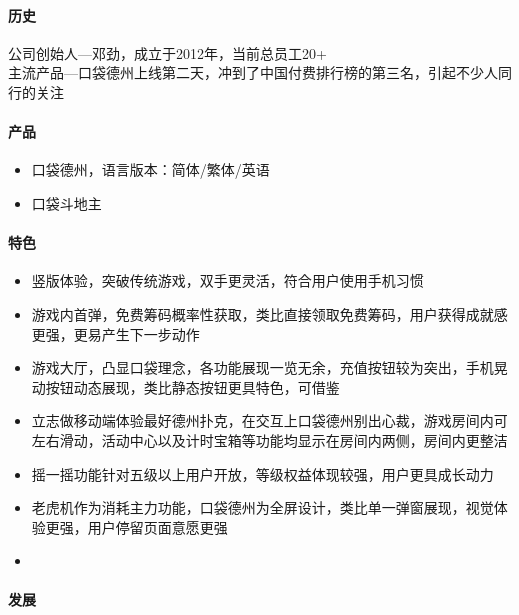 \documentclass[11pt]{article}
\providecommand{\tightlist}{%
      \setlength{\itemsep}{0pt}\setlength{\parskip}{0pt}}
\begin{document}
\hypertarget{ux5386ux53f2}{%
\paragraph{历史}\label{ux5386ux53f2}}

公司创始人---邓劲，成立于2012年，当前总员工20+\\
主流产品---口袋德州上线第二天，冲到了中国付费排行榜的第三名，引起不少人同行的关注

\hypertarget{ux4ea7ux54c1}{%
\paragraph{产品}\label{ux4ea7ux54c1}}

\begin{itemize}
\tightlist
\item
  口袋德州，语言版本：简体/繁体/英语
\item
  口袋斗地主
\end{itemize}

\hypertarget{ux7279ux8272}{%
\paragraph{特色}\label{ux7279ux8272}}

\begin{itemize}
\item
  竖版体验，突破传统游戏，双手更灵活，符合用户使用手机习惯
\item
  游戏内首弹，免费筹码概率性获取，类比直接领取免费筹码，用户获得成就感更强，更易产生下一步动作
\item
  游戏大厅，凸显口袋理念，各功能展现一览无余，充值按钮较为突出，手机晃动按钮动态展现，类比静态按钮更具特色，可借鉴
\item
  立志做移动端体验最好德州扑克，在交互上口袋德州别出心裁，游戏房间内可左右滑动，活动中心以及计时宝箱等功能均显示在房间内两侧，房间内更整洁
\item
  摇一摇功能针对五级以上用户开放，等级权益体现较强，用户更具成长动力
\item
  老虎机作为消耗主力功能，口袋德州为全屏设计，类比单一弹窗展现，视觉体验更强，用户停留页面意愿更强
\item
\end{itemize}

\hypertarget{ux53d1ux5c55}{%
\paragraph{发展}\label{ux53d1ux5c55}}
\end{document}
